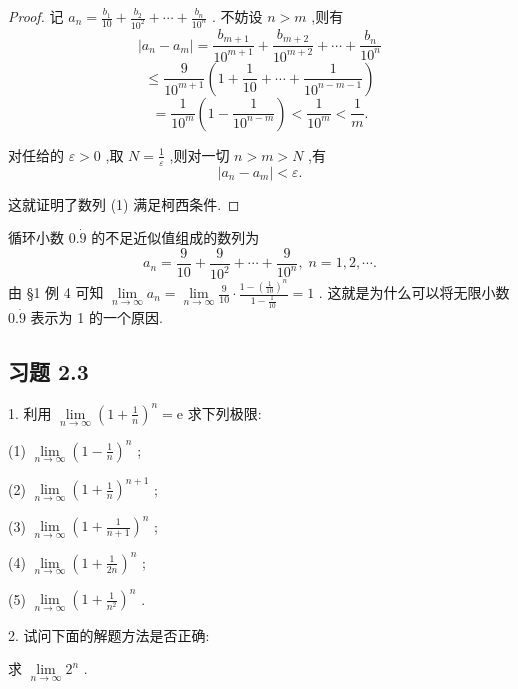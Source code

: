\begin{proof}
记 \({a}_{n} = \frac{{b}_{1}}{10} + \frac{{b}_{2}}{{10}^{2}} + \cdots  + \frac{{b}_{n}}{{10}^{n}}\) . 不妨设 \(n > m\) ,则有
\[
\left| {{a}_{n} - {a}_{m}}\right|  = \frac{{b}_{m + 1}}{{10}^{m + 1}} + \frac{{b}_{m + 2}}{{10}^{m + 2}} + \cdots  + \frac{{b}_{n}}{{10}^{n}}
\]
\[
\leq  \frac{9}{{10}^{m + 1}}\left( {1 + \frac{1}{10} + \cdots  + \frac{1}{{10}^{n - m - 1}}}\right)
\]
\[
= \frac{1}{{10}^{m}}\left( {1 - \frac{1}{{10}^{n - m}}}\right)  < \frac{1}{{10}^{m}} < \frac{1}{m}.
\]

对任给的 \(\varepsilon  > 0\) ,取 \(N = \frac{1}{\varepsilon }\) ,则对一切 \(n > m > N\) ,有
\[
\left| {{a}_{n} - {a}_{m}}\right|  < \varepsilon .
\]

这就证明了数列 (1) 满足柯西条件.
\end{proof}


循环小数 \(0.\dot{9}\) 的不足近似值组成的数列为
\[
{a}_{n} = \frac{9}{10} + \frac{9}{{10}^{2}} + \cdots  + \frac{9}{{10}^{n}},\;n = 1,2,\cdots .
\]
由 §1 例 4 可知 \(\mathop{\lim }\limits_{{n \rightarrow  \infty }}{a}_{n} = \mathop{\lim }\limits_{{n \rightarrow  \infty }}\frac{9}{10} \cdot  \frac{1 - {\left( \frac{1}{10}\right) }^{n}}{1 - \frac{1}{10}} = 1\) . 这就是为什么可以将无限小数 \(0.\dot{9}\) 表示为 1 的一个原因.

\subsection{习题 2.3}

1. 利用 \(\mathop{\lim }\limits_{{n \rightarrow  \infty }}{\left( 1 + \frac{1}{n}\right) }^{n} = \mathrm{e}\) 求下列极限:

(1) \(\mathop{\lim }\limits_{{n \rightarrow  \infty }}{\left( 1 - \frac{1}{n}\right) }^{n}\) ;

(2) \(\mathop{\lim }\limits_{{n \rightarrow  \infty }}{\left( 1 + \frac{1}{n}\right) }^{n + 1}\) ;

(3) \(\mathop{\lim }\limits_{{n \rightarrow  \infty }}{\left( 1 + \frac{1}{n + 1}\right) }^{n}\) ;

(4) \(\mathop{\lim }\limits_{{n \rightarrow  \infty }}{\left( 1 + \frac{1}{2n}\right) }^{n}\) ;

(5) \(\mathop{\lim }\limits_{{n \rightarrow  \infty }}{\left( 1 + \frac{1}{{n}^{2}}\right) }^{n}\) .

2. 试问下面的解题方法是否正确:

求 \(\mathop{\lim }\limits_{{n \rightarrow  \infty }}{2}^{n}\) .

